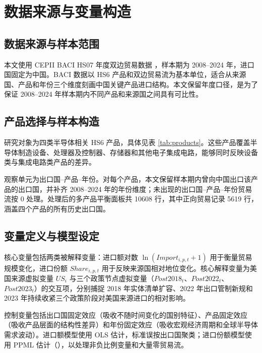 \section{数据来源与变量构造}

\subsection{数据来源与样本范围}

本文使用 CEPII BACI HS07 年度双边贸易数据 \citep{cepii_baci}，样本期为 2008--2024 年，进口国固定为中国。BACI 数据以 HS6 产品和双边贸易流为基本单位，适合从来源国、产品和年份三个维度刻画中国关键产品进口结构。本文保留年度口径，是为了保证 2008--2024 年样本期内不同产品和来源国之间具有可比性。

\subsection{产品选择与样本构造}

研究对象为四类半导体相关 HS6 产品，具体见表 \ref{tab:products}。这些产品覆盖半导体制造设备、处理器及控制器、存储器和其他电子集成电路，能够同时反映设备类与集成电路类产品的差异。



观察单元为出口国--产品--年份。对每个产品，本文保留样本期内曾向中国出口该产品的出口国，并补齐 2008--2024 年的年份维度；未出现的出口国--产品--年份贸易流按 0 处理。处理后的多产品平衡面板共 10608 行，其中正向贸易记录 5619 行，涵盖四个产品的所有历史出口国。

\subsection{变量定义与模型设定}

核心变量包括两类被解释变量：进口额对数 $\ln(Import_{i,p,t}+1)$ 用于衡量贸易规模变化，进口份额 $Share_{i,p,t}$ 用于反映来源国相对地位变化。核心解释变量为美国来源虚拟变量 $US_i$ 与三个政策节点虚拟变量（$Post2018_t$、$Post2022_t$、$Post2023_t$）的交互项，分别捕捉 2018 年实体清单扩容、2022 年出口管制新规和 2023 年持续收紧三个政策阶段对美国来源进口的相对影响。

控制变量包括出口国固定效应（吸收不随时间变化的国别特征）、产品固定效应（吸收产品层面的结构性差异）和年份固定效应（吸收宏观经济周期和全球半导体需求波动）。进口额模型使用 OLS 估计，标准误按出口国聚类；进口份额模型使用 PPML 估计（\citet{silva_tenreyro_2006}），以处理非负比例变量和大量零贸易流。
